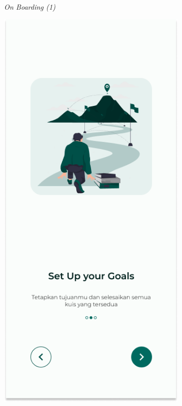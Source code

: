 \begin{figure}[H]
\begin{subfigure}[b]{0.23\textwidth}
	  \caption{\textit{On Boarding (1)}}
	  \label{fig:HasilBoarding}
	\end{subfigure}
	\begin{subfigure}[b]{0.23\textwidth}
		\centering
	  \includegraphics[width=\linewidth]{contents/chapter-3/images/HF-Boarding-2.png}

\end{subfigure}
\end{figure}
